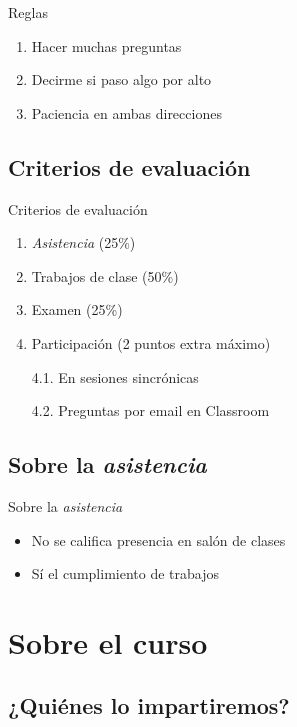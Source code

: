 \documentclass[
  11pt,
  ignorenonframetext,
]{beamer}
\begin{document}
\begin{frame}{Reglas}
\begin{enumerate}
\item
  Hacer muchas preguntas
\item
  Decirme si paso algo por alto
\item
  Paciencia en ambas direcciones
\end{enumerate}
\end{frame}

\subsection{Criterios de evaluación}\label{criterios-de-evaluaciuxf3n}

\begin{frame}{Criterios de evaluación}
\begin{enumerate}
\item
  \emph{Asistencia} (25\%)
\item
  Trabajos de clase (50\%)
\item
  Examen (25\%)
\item
  Participación (2 puntos extra máximo)

  4.1. En sesiones sincrónicas

  4.2. Preguntas por email en Classroom
\end{enumerate}
\end{frame}

\subsection{\texorpdfstring{Sobre la
\emph{asistencia}}{Sobre la asistencia}}\label{sobre-la-asistencia}

\begin{frame}{Sobre la \emph{asistencia}}
\begin{itemize}
\item
  No se califica presencia en salón de clases
\item
  Sí el cumplimiento de trabajos
\end{itemize}
\end{frame}

\section{Sobre el curso}\label{sobre-el-curso}

\subsection{¿Quiénes lo impartiremos?}\label{quiuxe9nes-lo-impartiremos}
\end{document}
